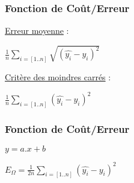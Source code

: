 \begin{frame}
  \frametitle{Fonction de Coût/Erreur}
  \begin{minipage}[l]{0.40\linewidth}
  \underline{Erreur moyenne} :
  \begin{center}
    $\frac{1}{n}\sum_{i=[1..n]}\sqrt{( \hat{y_i} - y_i )^2}$
    \newline
  \end{center}
  \underline{Critère des moindres carrés} :
  \begin{center}
    $\frac{1}{n}\sum_{i=[1..n]}( \hat{y_i} - y_i )^2$
  \end{center}
  \end{minipage}\hfill
  \begin{minipage}[l]{0.59\linewidth}
  \end{minipage}\hfill
\end{frame}

\begin{frame}
  \frametitle{Fonction de Coût/Erreur}
  \begin{minipage}[l]{0.49\linewidth}
  \begin{center}
    $y = a.x+b$
  \end{center}
  \end{minipage}\hfill
  \begin{minipage}[l]{0.49\linewidth}
    $\boxed{E_\Omega = \frac{1}{2n}\sum_{i=[1..n]}( \hat{y_i} - y_i )^2}$ \\
  \end{minipage}\hfill
\end{frame}
